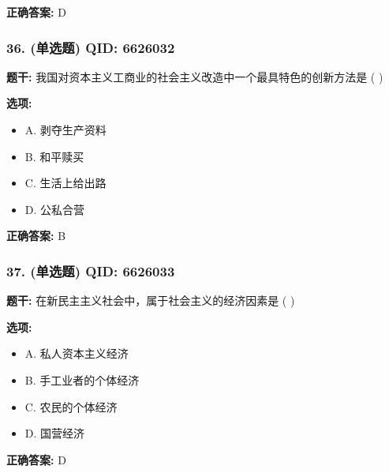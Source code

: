 \documentclass[12pt,UTF8]{ctexart}
\begin{document}
\textbf{正确答案:}
D

\vspace{0.3em}\hrulefill\vspace{0.7em}

\subsubsection*{36. (单选题) \small QID: 6626032}

\textbf{题干:}
我国对资本主义工商业的社会主义改造中一个最具特色的创新方法是  ( )

\textbf{选项:}
\begin{itemize}[leftmargin=*]

  \item A. 剥夺生产资料

  \item B. 和平赎买

  \item C. 生活上给出路

  \item D. 公私合营

\end{itemize}

\textbf{正确答案:}
B

\vspace{0.3em}\hrulefill\vspace{0.7em}

\subsubsection*{37. (单选题) \small QID: 6626033}

\textbf{题干:}
在新民主主义社会中，属于社会主义的经济因素是  ( )

\textbf{选项:}
\begin{itemize}[leftmargin=*]

  \item A. 私人资本主义经济

  \item B. 手工业者的个体经济

  \item C. 农民的个体经济

  \item D. 国营经济

\end{itemize}

\textbf{正确答案:}
D

\vspace{0.3em}\hrulefill\vspace{0.7em}
\end{document}
